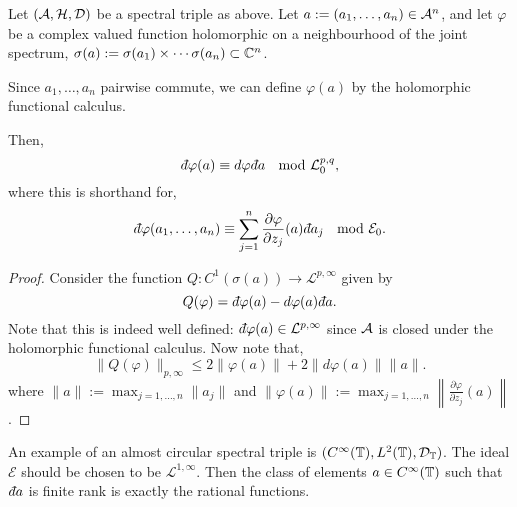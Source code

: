 \begin{proposition}
    Let $(\mathcal{A},\mathcal{H},\mathcal{D})$ be a spectral triple as above. Let $a := (a_1,\ldots,a_n) \in \mathcal{A}^n$,
    and let $\varphi$ be a complex valued function holomorphic
    on a neighbourhood of
    the joint spectrum, $\sigma(a) := \sigma(a_1)\times \cdots \sigma(a_n) \subset \mathbb{C}^n$.
    
    Since $a_1,\ldots,a_n$ pairwise commute, we can define $\varphi(a)$
    by the holomorphic functional calculus.    
    
    Then,
    \begin{equation}
        \qd \varphi(a) \equiv d\varphi \qd a \;\mod{\mathcal{L}^{p,q}_0},
    \end{equation}
    where this is shorthand for,
    \begin{equation}
        \qd \varphi(a_1,\ldots,a_n) \equiv \sum_{j=1}^n \frac{\partial \varphi}{\partial z_j}(a)\qd a_j \;\mod{\mathcal{E}_0}.
    \end{equation}
\end{proposition}
\begin{proof}
    Consider the function $Q:C^1(\sigma(a))\to \mathcal{L}^{p,\infty}$
    given by
    \begin{equation}
        Q(\varphi) = \qd \varphi(a) - d\varphi(a)\qd a.
    \end{equation}
    Note that this is indeed well defined: $\qd\varphi(a) \in \mathcal{L}^{p,\infty}$
    since $\mathcal{A}$ is closed under the holomorphic functional calculus.
    Now note that,
    \begin{equation}
        \|Q(\varphi)\|_{p,\infty} \leq 2\|\varphi(a)\| + 2\|d\varphi(a)\|\|a\|.
    \end{equation}
    where $\|a\| := \max_{j = 1,\ldots,n} \|a_j\|$
    and $\|\varphi(a)\| := \max_{j=1,\ldots,n} \left\|\frac{\partial \varphi}{\partial z_j}(a)\right\|$.
    
\end{proof}


\begin{example}
    An example of an almost circular spectral triple is $(C^\infty(\mathbb{T}),L^2(\mathbb{T}),\mathcal{D}_{\mathbb{T}})$.
    The ideal $\mathcal{E}$ should be chosen to be $\mathcal{L}^{1,\infty}$. Then
    the class of elements $a \in C^\infty(\mathbb{T})$ such that $\qd a$ is finite
    rank is exactly the rational functions. 
\end{example}

